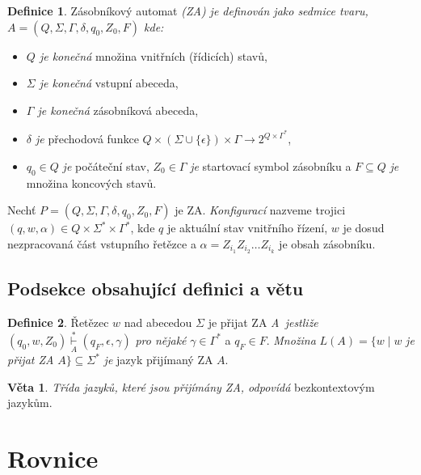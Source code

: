\documentclass[a4paper, twocolumn, 11pt]{article}
\theoremstyle{definition}
\newtheorem{definice}{Definice}
\theoremstyle{definition}
\newtheorem{veta}{Věta}
\begin{document}
    \begin{definice} \label{def}
        Zásobníkový automat \emph{(ZA) je definován jako sedmice tvaru, $A = (Q, \Sigma, \Gamma, \delta, q_0, Z_0, F)$ kde:}
        \begin{itemize}
            \item \emph{$Q$ je konečná} množina vnitřních (řídicích) stavů,
            \item \emph{$\Sigma$ je konečná} vstupní abeceda,
            \item \emph{$\Gamma$ je konečná} zásobníková abeceda,
            \item \emph{$\delta$ je} přechodová funkce $Q\times(\Sigma\cup\{\epsilon\})\times\Gamma\rightarrow2^{Q\times\Gamma^{\ast}}$,
            \item $q_0 \in Q$ \emph{je} počáteční stav, $Z_0\in\Gamma$ \emph{je} startovací symbol zásobníku a $F \subseteq Q$ \emph{je} množina koncových stavů.
        \end{itemize}
        \par Nechť $P = (Q, \Sigma, \Gamma, \delta, q_0, Z_0, F)$ je ZA. \emph{Konfigurací} nazveme trojici $(q, w, \alpha) \in Q\times\Sigma^{\ast}\times\Gamma^{\ast}$, 
        kde $q$ je aktuální stav vnitřního řízení, $w$ je dosud nezpracovaná část vstupního řetězce a $\alpha = Z_{i_1} Z_{i_2} \dots Z_{i_k}$ je obsah zásobníku.
    \end{definice}

    \subsection{Podsekce obsahující definici a větu}
    
    \begin{definice}
        Řetězec $w$ nad abecedou $\Sigma$ je přijat ZA \emph{A~jestliže} $(q_0, w, Z_0) \underset{A}{\overset{\ast}{\vdash}} (q_F, \epsilon, \gamma)$ 
        \emph{pro nějaké} $\gamma\in\Gamma^{\ast}$ a $q_F \in F$.
        \emph{Množina} $L(A) = \{w \mid w$ \emph{je přijat ZA} $A\} \subseteq\Sigma^{\ast}$ \emph{je} jazyk přijímaný ZA $A$.
    \end{definice}

    \begin{veta}
        \emph{Třída jazyků, které jsou přijímány ZA, odpovídá} bezkontextovým jazykům.
    \end{veta}

    \section{Rovnice}
    
\end{document}

